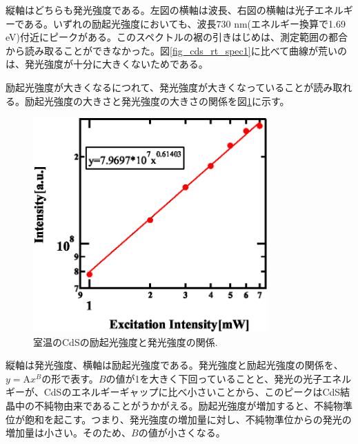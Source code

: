 \documentclass[11pt,a4j]{jsarticle}
\begin{document}
縦軸はどちらも発光強度である。左図の横軸は波長、右図の横軸は光子エネルギーである。いずれの励起光強度においても、波長730 nm(エネルギー換算で1.69 eV)付近にピークがある。このスペクトルの裾の引きはじめは、測定範囲の都合から読み取ることができなかった。図\ref{fig_cds_rt_spec1}に比べて曲線が荒いのは、発光強度が十分に大きくないためである。


励起光強度が大きくなるにつれて、発光強度が大きくなっていることが読み取れる。励起光強度の大きさと発光強度の大きさの関係を図\ref{fig_cds_imp_int1}に示す。

\newpage

\begin{figure}[ht]
 \centering
 \includegraphics[clip,width=9cm]{start2_CdS_imp_Int.eps}
 \caption{室温のCdSの励起光強度と発光強度の関係.}
 \label{fig_cds_imp_int1}
\end{figure}

縦軸は発光強度、横軸は励起光強度である。発光強度と励起光強度の関係を、$y=\mathrm{A}x^{B}$の形で表す。$B$の値が1を大きく下回っていることと、発光の光子エネルギーが、CdSのエネルギーギャップに比べ小さいことから、このピークはCdS結晶中の不純物由来であることがうかがえる。励起光強度が増加すると、不純物準位が飽和を起こす。つまり、発光強度の増加量に対し、不純物準位からの発光の増加量は小さい。そのため、$B$の値が小さくなる。

\newpage
\end{document}

